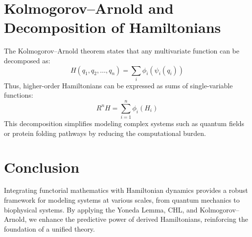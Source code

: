 \documentclass{article}
\begin{document}
\section{Kolmogorov–Arnold and Decomposition of Hamiltonians}
The Kolmogorov–Arnold theorem states that any multivariate function can be decomposed as:
\[
H(q_1, q_2, \dots, q_n) = \sum_{i} \phi_i(\psi_i(q_i))
\]
Thus, higher-order Hamiltonians can be expressed as sums of single-variable functions:
\[
R^nH = \sum_{i=1}^n \phi_i(H_i)
\]
This decomposition simplifies modeling complex systems such as quantum fields or protein folding pathways by reducing the computational burden.

\section{Conclusion}
Integrating functorial mathematics with Hamiltonian dynamics provides a robust framework for modeling systems at various scales, from quantum mechanics to biophysical systems. By applying the Yoneda Lemma, CHL, and Kolmogorov–Arnold, we enhance the predictive power of derived Hamiltonians, reinforcing the foundation of a unified theory.
\end{document}
